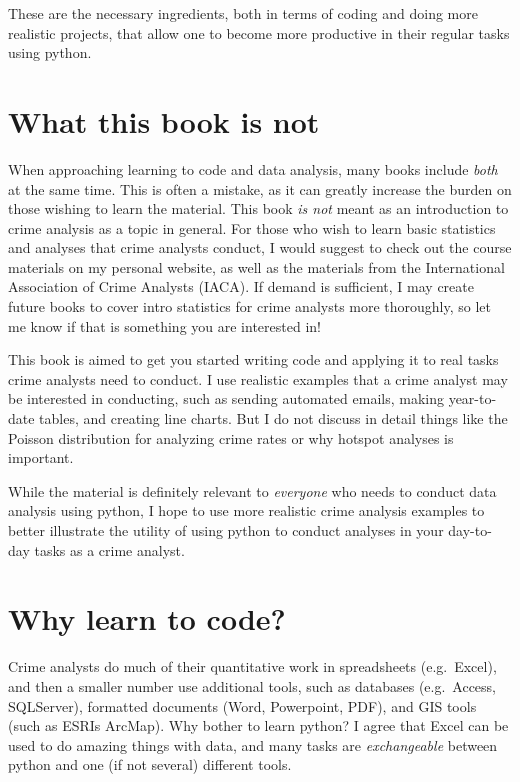 \documentclass[
  letterpaper,
]{scrbook}
\begin{document}
These are the necessary ingredients, both in terms of coding and doing
more realistic projects, that allow one to become more productive in
their regular tasks using python.

\section*{What this book is not}\label{what-this-book-is-not}


When approaching learning to code and data analysis, many books include
\emph{both} at the same time. This is often a mistake, as it can greatly
increase the burden on those wishing to learn the material. This book
\emph{is not} meant as an introduction to crime analysis as a topic in
general. For those who wish to learn basic statistics and analyses that
crime analysts conduct, I would suggest to check out the course
materials on my personal website, as well as the materials from the
International Association of Crime Analysts (IACA). If demand is
sufficient, I may create future books to cover intro statistics for
crime analysts more thoroughly, so let me know if that is something you
are interested in!

This book is aimed to get you started writing code and applying it to
real tasks crime analysts need to conduct. I use realistic examples that
a crime analyst may be interested in conducting, such as sending
automated emails, making year-to-date tables, and creating line charts.
But I do not discuss in detail things like the Poisson distribution for
analyzing crime rates or why hotspot analyses is important.

While the material is definitely relevant to \emph{everyone} who needs
to conduct data analysis using python, I hope to use more realistic
crime analysis examples to better illustrate the utility of using python
to conduct analyses in your day-to-day tasks as a crime analyst.

\section*{Why learn to code?}\label{why-learn-to-code}


Crime analysts do much of their quantitative work in spreadsheets
(e.g.~Excel), and then a smaller number use additional tools, such as
databases (e.g.~Access, SQLServer), formatted documents (Word,
Powerpoint, PDF), and GIS tools (such as ESRIs ArcMap). Why bother to
learn python? I agree that Excel can be used to do amazing things with
data, and many tasks are \emph{exchangeable} between python and one (if
not several) different tools.
\end{document}
